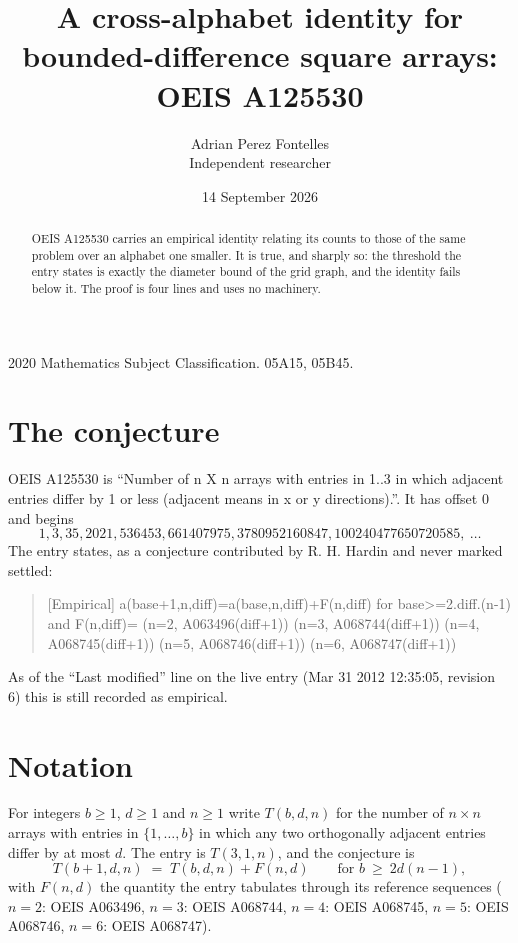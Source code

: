 \documentclass[11pt,a4paper]{article}
\title{A cross-alphabet identity for bounded-difference square arrays: OEIS A125530}
\author{Adrian Perez Fontelles\\ \small Independent researcher}
\date{14 September 2026}
\theoremstyle{plain}
\theoremstyle{definition}
\begin{document}
\maketitle

\begin{abstract}
OEIS A125530 carries an empirical identity relating its counts to those of the same problem over an
alphabet one smaller. It is true, and sharply so: the threshold the entry states is exactly the
diameter bound of the grid graph, and the identity fails below it. The proof is four lines and
uses no machinery.
\end{abstract}

\noindent\small 2020 Mathematics Subject Classification. 05A15, 05B45.\normalsize

\section{The conjecture}

OEIS A125530 is ``Number of n X n arrays with entries in 1..3 in which adjacent entries differ by 1 or less (adjacent means in x or y directions).''. It has offset $0$ and begins
\[
1, 3, 35, 2021, 536453, 661407975, 3780952160847, 100240477650720585,\ \dots
\]
The entry states, as a conjecture contributed by R. H. Hardin and never marked settled:
\begin{quote}
[Empirical] a(base+1,n,diff)=a(base,n,diff)+F(n,diff) for base>=2.diff.(n-1) and F(n,diff)= (n=2, A063496(diff+1)) (n=3, A068744(diff+1)) (n=4, A068745(diff+1)) (n=5, A068746(diff+1)) (n=6, A068747(diff+1))
\end{quote}
As of the ``Last modified'' line on the live entry (Mar 31 2012 12:35:05, revision 6)
this is still recorded as empirical.

\section{Notation}

For integers $b\ge1$, $d\ge1$ and $n\ge1$ write $T(b,d,n)$ for the number of $n\times n$ arrays
with entries in $\{1,\dots,b\}$ in which any two orthogonally adjacent entries differ by at
most $d$. The entry is $T(3,1,n)$, and the conjecture is
\[
T(b+1,d,n)\;=\;T(b,d,n)+F(n,d)\qquad\text{for } b\ \ge\ 2d(n-1),
\]
with $F(n,d)$ the quantity the entry tabulates through its reference sequences ($n=2$: OEIS A063496, $n=3$: OEIS A068744, $n=4$: OEIS A068745, $n=5$: OEIS A068746, $n=6$: OEIS A068747).
\end{document}
